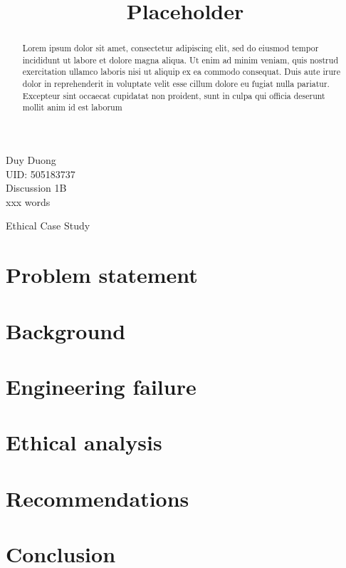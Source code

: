 \documentclass[12pt]{article}
\begin{document}
		\title{Placeholder}
	\setlength{\parindent}{0pt}
	\begin{flushleft}
		Duy Duong\\UID: 505183737\\Discussion 1B\\xxx words
	\end{flushleft}
	
	\hfill
	\begin{center}
		{\Huge Ethical Case Study}
	\end{center}
	\hfill
	
	\begin{abstract}
Lorem ipsum dolor sit amet, consectetur adipiscing elit, sed do eiusmod tempor incididunt ut labore et dolore magna aliqua. Ut enim ad minim veniam, quis nostrud exercitation ullamco laboris nisi ut aliquip ex ea commodo consequat. Duis aute irure dolor in reprehenderit in voluptate velit esse cillum dolore eu fugiat nulla pariatur. Excepteur sint occaecat cupidatat non proident, sunt in culpa qui officia deserunt mollit anim id est laborum
	\end{abstract}
	\setlength{\parindent}{4em}
	\setlength{\parskip}{1em}
	\section*{Problem statement}
	\section*{Background}
	\section*{Engineering failure}
	\section*{Ethical analysis}
	\section*{Recommendations}
	\section*{Conclusion}
\end{document}
